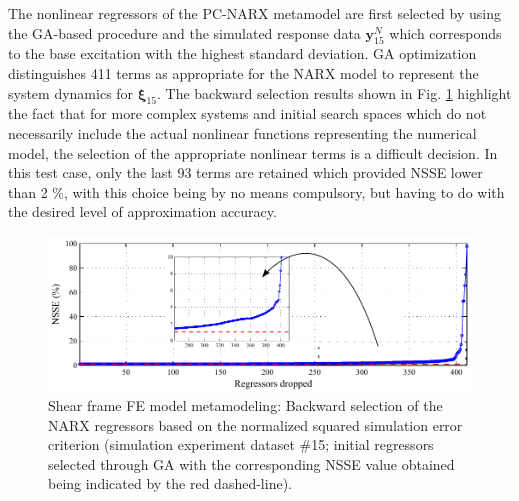 \documentclass[preprint,3p,review,times,11pt]{elsarticle}
\newcommand{\bld}[1]{\boldsymbol{#1}}
\newcommand{\bxi}{\bld{\xi}}
\begin{document}
The nonlinear regressors of the PC-NARX metamodel are first selected by using the GA-based procedure and the simulated response data ${\bld y}_{15}^N$ which corresponds to the base excitation with the highest standard deviation. GA optimization distinguishes 411 terms as appropriate for the NARX model to represent the system dynamics for $\bxi_{15}$. The backward selection results shown in Fig. \ref{fig:SF_MSS_A} highlight the fact that for more complex systems and initial search spaces which do not necessarily include the actual nonlinear functions representing the numerical model, the selection of the appropriate nonlinear terms is a difficult decision. In this test case, only the last 93 terms are retained which provided NSSE lower than 2 $\%$, with this choice being by no means compulsory, but having to do with the desired level of approximation accuracy.  

\begin{figure}[t!]
\begin{center}
\includegraphics[width = 1\textwidth]{figs/multi_MSS_StageA.pdf}
\caption{Shear frame FE model metamodeling: Backward selection of the NARX regressors based on the normalized squared simulation error criterion (simulation experiment dataset $\#$15; initial regressors selected through GA with the corresponding NSSE value obtained being indicated by the red dashed-line).} \label{fig:SF_MSS_A}
\end{center}
\end{figure}
\end{document}
